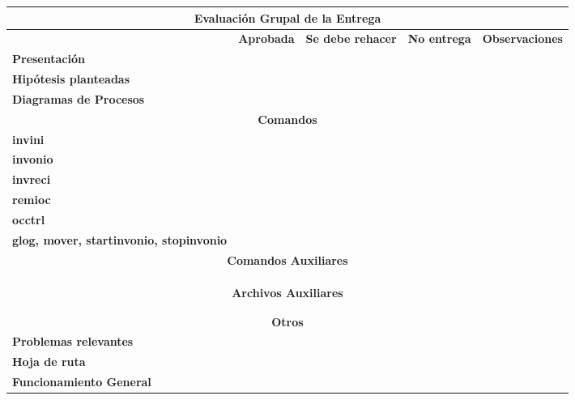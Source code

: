 \documentclass[10pt,a4paper]{article}
\begin{document}
\begin{center}
    \begin{tabular}{|m{}|>{\centering\arraybackslash}m{}|>{\centering\arraybackslash}m{}|>{\centering\arraybackslash}m{}|>{\centering\arraybackslash}m{}|}
      \hline
      \multicolumn{5}{|c|}{\bf{Evaluación Grupal de la Entrega}} \\ 
      \hline
      & \bf{Aprobada} & \bf{Se debe rehacer} & \bf{No entrega} & \bf{Observaciones} \\ \hline
      \bf Presentación & & & & \\ \hline
      \bf Hipótesis planteadas & & & & \\ \hline
      \bf Diagramas de Procesos & & & & \\ \hline
      \multicolumn{5}{|c|}{\bf Comandos} \\ 
      \hline
      \bf invini & & & & \\ \hline
      \bf invonio & & & & \\ \hline
      \bf invreci & & & & \\ \hline
      \bf remioc & & & & \\ \hline
      \bf occtrl & & & & \\ \hline
      \bf glog, mover, startinvonio, stopinvonio & & & & \\ \hline
      \multicolumn{5}{|c|}{\bf Comandos Auxiliares} \\ 
      \hline
      & & & & \\ \hline
      & & & & \\ \hline
      & & & & \\ \hline
      \multicolumn{5}{|c|}{\bf Archivos Auxiliares} \\ 
      \hline
      & & & & \\ \hline
      & & & & \\ \hline 
      \multicolumn{5}{|c|}{\bf Otros} \\ \hline
      \bf Problemas relevantes & & & & \\ \hline
      \bf Hoja de ruta & & & & \\ \hline
      \bf Funcionamiento General & & & & \\ \hline
    \end{tabular}
  
 \end{center}
\end{document}
